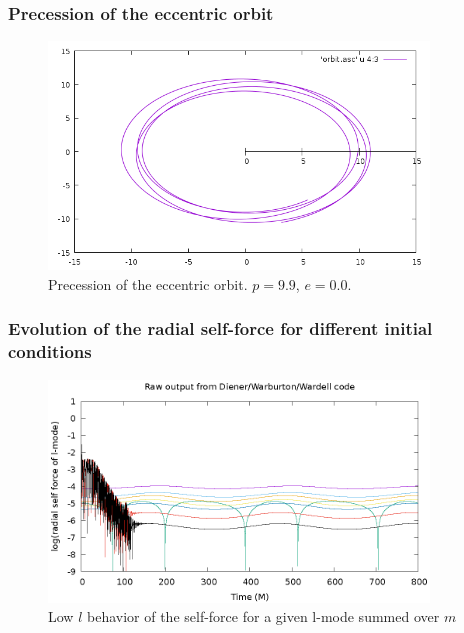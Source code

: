 \documentclass{beamer}
\begin{document}
\begin{frame}
  \frametitle{Precession of the eccentric orbit}
  \begin{figure}
    \includegraphics[width=0.9\textwidth]{orbitevolvedg44p99e01}
    \caption{Precession of the eccentric orbit. $p=9.9$, $e=0.0$.}
  \end{figure}
\end{frame}


\begin{frame}
  \frametitle{Evolution of the radial self-force for different initial conditions}
  \begin{figure}
  \includegraphics[width=0.9\textwidth]{rawRadialSelForceModes}
  \caption{Low $l$ behavior of the self-force for a given l-mode summed over $m$}
  \end{figure}
\end{frame}
\end{document}
